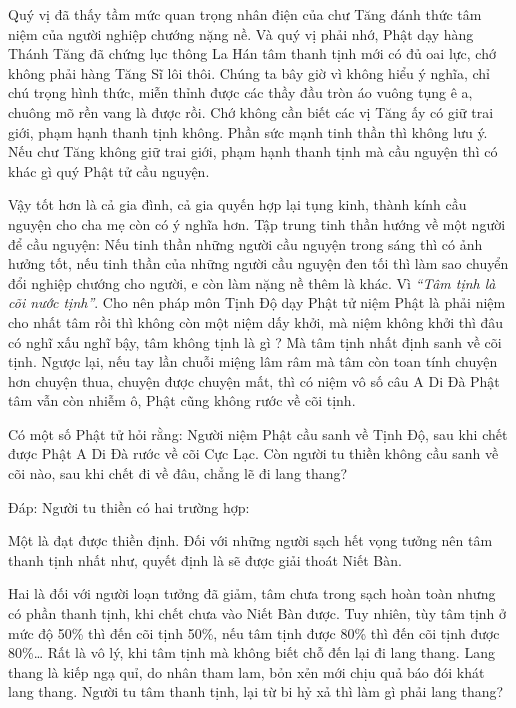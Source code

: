 \documentclass[
  12pt,
  oneside]{book}
\begin{document}
Quý vị đã thấy tầm mức quan trọng nhân điện của chư Tăng đánh thức tâm niệm của người nghiệp chướng nặng nề. Và quý vị phải nhớ, Phật dạy hàng Thánh Tăng đã chứng lục thông La Hán tâm thanh tịnh mới có đủ oai lực, chớ không phải hàng Tăng Sĩ lôi thôi. Chúng ta bây giờ vì không hiểu ý nghĩa, chỉ chú trọng hình thức, miễn thỉnh được các thầy đầu tròn áo vuông tụng ê a, chuông mõ rền vang là được rồi. Chớ không cần biết các vị Tăng ấy có giữ trai giới, phạm hạnh thanh tịnh không. Phần sức mạnh tinh thần thì không lưu ý. Nếu chư Tăng không giữ trai giới, phạm hạnh thanh tịnh mà cầu nguyện thì có khác gì quý Phật tử cầu nguyện.

Vậy tốt hơn là cả gia đình, cả gia quyến hợp lại tụng kinh, thành kính cầu nguyện cho cha mẹ còn có ý nghĩa hơn. Tập trung tinh thần hướng về một người để cầu nguyện: Nếu tinh thần những người cầu nguyện trong sáng thì có ảnh hưởng tốt, nếu tinh thần của những người cầu nguyện đen tối thì làm sao chuyển đổi nghiệp chướng cho người, e còn làm nặng nề thêm là khác. Vì \emph{``Tâm tịnh là cõi nước tịnh''}. Cho nên pháp môn Tịnh Độ dạy Phật tử niệm Phật là phải niệm cho nhất tâm rồi thì không còn một niệm dấy khởi, mà niệm không khởi thì đâu có nghĩ xấu nghĩ bậy, tâm không tịnh là gì ? Mà tâm tịnh nhất định sanh về cõi tịnh. Ngược lại, nếu tay lần chuỗi miệng lâm râm mà tâm còn toan tính chuyện hơn chuyện thua, chuyện được chuyện mất, thì có niệm vô số câu A Di Đà Phật tâm vẫn còn nhiễm ô, Phật cũng không rước về cõi tịnh.

Có một số Phật tử hỏi rằng: Người niệm Phật cầu sanh về Tịnh Độ, sau khi chết được Phật A Di Đà rước về cõi Cực Lạc. Còn người tu thiền không cầu sanh về cõi nào, sau khi chết đi về đâu, chẳng lẽ đi lang thang?

Đáp: Người tu thiền có hai trường hợp:

Một là đạt được thiền định. Đối với những người sạch hết vọng tưởng nên tâm thanh tịnh nhất như, quyết định là sẽ được giải thoát Niết Bàn.

Hai là đối với người loạn tưởng đã giảm, tâm chưa trong sạch hoàn toàn nhưng có phần thanh tịnh, khi chết chưa vào Niết Bàn được. Tuy nhiên, tùy tâm tịnh ở mức độ 50\% thì đến cõi tịnh 50\%, nếu tâm tịnh được 80\% thì đến cõi tịnh được 80\%\ldots{} Rất là vô lý, khi tâm tịnh mà không biết chỗ đến lại đi lang thang. Lang thang là kiếp ngạ quỉ, do nhân tham lam, bỏn xẻn mới chịu quả báo đói khát lang thang. Người tu tâm thanh tịnh, lại từ bi hỷ xả thì làm gì phải lang thang?
\end{document}
